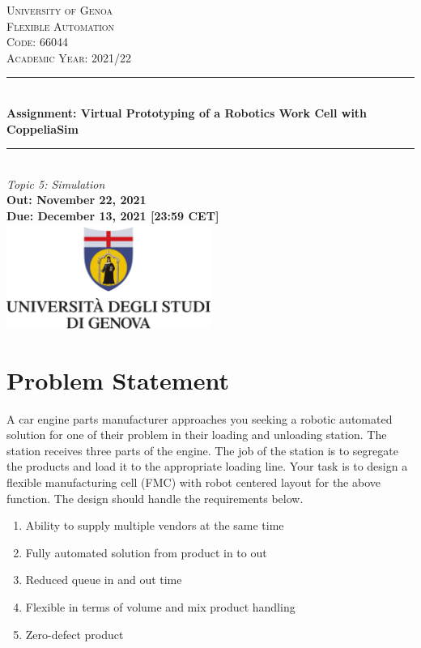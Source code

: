\documentclass[12pt, a4paper]{article}
\begin{document}
\begin{titlepage}
\newcommand{\HRule}{\rule{\linewidth}{0.5mm}} 							%
\center 
\textsc{\LARGE University of Genoa}\\[1cm]
\textsc{\Large Flexible Automation}\\[0.2cm]
\textsc{\large Code: 66044}\\[1cm] 										%
\textsc{\large Academic Year: 2021/22}\\[1cm] 										\HRule \\[0.8cm]
{ \huge \bfseries Assignment: Virtual Prototyping of a Robotics Work Cell with CoppeliaSim}\\[0.7cm]								%
\HRule \\[1.5cm]
\large
\emph{Topic 5: Simulation }\\[1cm]
{\large \textbf{Out: November 22, 2021 \\[0.5cm] Due: December 13, 2021 [23:59 CET]}}\\[3.5cm]													
\includegraphics[width=0.5\textwidth]{images/UnigeLogo.png}\\[1cm] 	%
\vfill 
\end{titlepage}


\section*{Problem Statement} 
A car engine parts manufacturer approaches you seeking a robotic automated solution for one of their problem in their loading and unloading station. The station receives three parts of the engine. The job of the station is to segregate the products and load it to the appropriate loading line. Your task is to design a flexible manufacturing cell (FMC) with robot centered layout for the above function. The design should handle the requirements below. 
\begin{enumerate}
    \item Ability to supply multiple vendors at the same time 
    \item Fully automated solution from product in to out
    \item Reduced queue in and out time
    \item Flexible in terms of volume and mix product handling
    \item Zero-defect product 
\end{enumerate}
\end{document}
